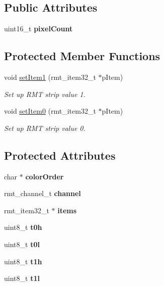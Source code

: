 \subsection*{Public Attributes}
\begin{DoxyCompactItemize}
\item 
\mbox{\label{classStrip_a4ec8f153e5eec7ca580b9b045d070e27}} 
uint16\+\_\+t {\bfseries pixel\+Count}
\end{DoxyCompactItemize}
\subsection*{Protected Member Functions}
\begin{DoxyCompactItemize}
\item 
void \mbox{\hyperlink{classStrip_a5f2b87e24509442384c120e27296da5e}{set\+Item1}} (rmt\+\_\+item32\+\_\+t $\ast$p\+Item)
\begin{DoxyCompactList}\small\item\em Set up R\+MT strip value 1. \end{DoxyCompactList}\item 
void \mbox{\hyperlink{classStrip_a379d65a972db69e2534955c364a01d35}{set\+Item0}} (rmt\+\_\+item32\+\_\+t $\ast$p\+Item)
\begin{DoxyCompactList}\small\item\em Set up R\+MT strip value 0. \end{DoxyCompactList}\end{DoxyCompactItemize}
\subsection*{Protected Attributes}
\begin{DoxyCompactItemize}
\item 
\mbox{\label{classStrip_a890f033a01dbb5af15081b503f4c004c}} 
char $\ast$ {\bfseries color\+Order}
\item 
\mbox{\label{classStrip_a993faa0433750e640e88f5d8b58254fc}} 
rmt\+\_\+channel\+\_\+t {\bfseries channel}
\item 
\mbox{\label{classStrip_a0524c7ec7e9412177d336661b195ffe2}} 
rmt\+\_\+item32\+\_\+t $\ast$ {\bfseries items}
\item 
\mbox{\label{classStrip_a45cf8985438678f1d5dba78c39a40e97}} 
uint8\+\_\+t {\bfseries t0h}
\item 
\mbox{\label{classStrip_a1b8aa83037fc9249fa5425516e7fcb02}} 
uint8\+\_\+t {\bfseries t0l}
\item 
\mbox{\label{classStrip_abdfed01ad1d8427cb19b75c9ff330d8c}} 
uint8\+\_\+t {\bfseries t1h}
\item 
\mbox{\label{classStrip_a7b78bb5acc0d1d89cb9ea187755545fb}} 
uint8\+\_\+t {\bfseries t1l}
\end{DoxyCompactItemize}


